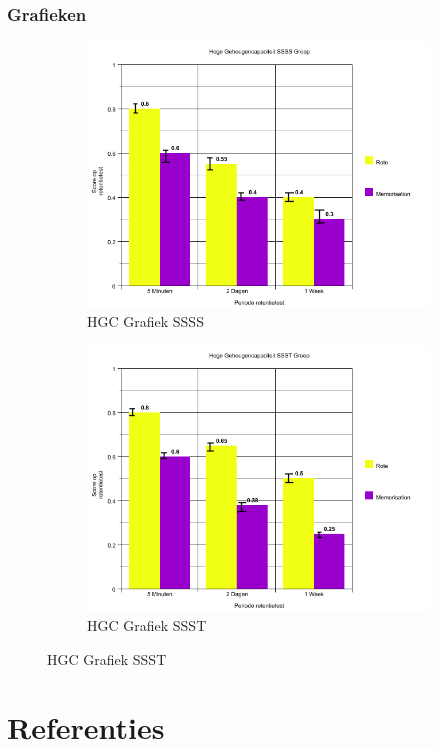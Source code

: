\documentclass[12pt,a4paper]{article}
\begin{document}
    	\newpage
    	\subsubsection{Grafieken} 
    	\begin{figure}[h]
    		\begin{subfigure}{0.6\textwidth}
    			\includegraphics[width=\linewidth]{grafiek1}
    			\caption{HGC Grafiek SSSS}
    		\end{subfigure}
    		\begin{subfigure}{0.6\textwidth}
    			\includegraphics[width=\linewidth]{grafiek3}
    			\caption{HGC Grafiek SSST}
    		\end{subfigure}
    	\end{figure}

    \newpage
    \section{Referenties}
    
	\printbibliography
    
\end{document}
